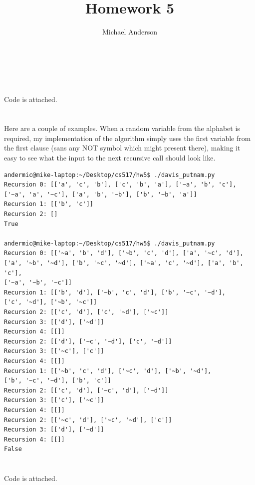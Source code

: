 \documentclass{article}
\author{Michael Anderson}
\title{Homework 5}
\begin{document}
\maketitle
{}
\\
\flushleft
\newpage

\section{}
Code is attached.

\section{}
Here are a couple of examples. When a random variable from the alphabet is
required, my implementation of the algorithm simply uses the first variable from
the first clause (sans any NOT symbol which might present there), making it
easy to see what the input to the next recursive call should look like.

\begin{verbatim}
andermic@mike-laptop:~/Desktop/cs517/hw5$ ./davis_putnam.py
Recursion 0: [['a', 'c', 'b'], ['c', 'b', 'a'], ['~a', 'b', 'c'], 
['~a', 'a', '~c'], ['a', 'b', '~b'], ['b', '~b', 'a']]
Recursion 1: [['b', 'c']]
Recursion 2: []
True

andermic@mike-laptop:~/Desktop/cs517/hw5$ ./davis_putnam.py
Recursion 0: [['~a', 'b', 'd'], ['~b', 'c', 'd'], ['a', '~c', 'd'],
['a', '~b', '~d'], ['b', '~c', '~d'], ['~a', 'c', '~d'], ['a', 'b', 'c'],
['~a', '~b', '~c']]
Recursion 1: [['b', 'd'], ['~b', 'c', 'd'], ['b', '~c', '~d'], 
['c', '~d'], ['~b', '~c']]
Recursion 2: [['c', 'd'], ['c', '~d'], ['~c']]
Recursion 3: [['d'], ['~d']]
Recursion 4: [[]]
Recursion 2: [['d'], ['~c', '~d'], ['c', '~d']]
Recursion 3: [['~c'], ['c']]
Recursion 4: [[]]
Recursion 1: [['~b', 'c', 'd'], ['~c', 'd'], ['~b', '~d'], 
['b', '~c', '~d'], ['b', 'c']]
Recursion 2: [['c', 'd'], ['~c', 'd'], ['~d']]
Recursion 3: [['c'], ['~c']]
Recursion 4: [[]]
Recursion 2: [['~c', 'd'], ['~c', '~d'], ['c']]
Recursion 3: [['d'], ['~d']]
Recursion 4: [[]]
False
\end{verbatim}

\section{}

\section{}
Code is attached.
\end{document}
